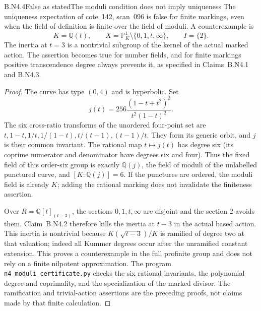 \begin{claim}{B.N4.4}{False as stated}{The moduli condition does not imply uniqueness}
The uniqueness expectation of cote~142, scan~096 is false for finite
markings, even when the field of definition is finite over the field of
moduli.  A counterexample is
\[
 K=\mathbb Q(t),\qquad
 X=\mathbb P^1_K\setminus\{0,1,t,\infty\},\qquad I=\{2\}.
\]
The inertia at $t=3$ is a nontrivial subgroup of the kernel of the actual
marked action.  The assertion becomes true for number fields, and for
finite markings positive transcendence degree always prevents it, as
specified in Claims~B.N4.1 and B.N4.3.
\end{claim}
\begin{proof}
The curve has type $(0,4)$ and is hyperbolic.  Set
\[
 j(t)=256\frac{(1-t+t^2)^3}{t^2(1-t)^2}.
\]
The six cross-ratio transforms of the unordered four-point set are
$t,1-t,1/t,1/(1-t),t/(t-1),(t-1)/t$.  They form its generic orbit,
and $j$ is their common invariant.  The rational map $t\mapsto j(t)$
has degree six (its coprime numerator and denominator have degrees six
and four).  Thus the fixed field of this order-six group is exactly
$\mathbb Q(j)$, the field of moduli of the unlabelled punctured curve,
and $[K:\mathbb Q(j)]=6$.  If the punctures are ordered, the moduli
field is already $K$; adding the rational marking does not invalidate
the finiteness assertion.

Over $R=\mathbb Q[t]_{(t-3)}$, the sections $0,1,t,\infty$ are disjoint
and the section $2$ avoids them.  Claim~B.N4.2 therefore kills the
inertia at $t-3$ in the actual based action.  This inertia is nontrivial
because $K(\sqrt{t-3})/K$ is ramified of degree two at that valuation;
indeed all Kummer degrees occur after the unramified constant extension.
This proves a counterexample in the full profinite group and does not
rely on a finite nilpotent approximation.  The program
\texttt{n4\_moduli\_certificate.py} checks the six rational invariants,
the polynomial degree and coprimality, and the specialization of the
marked divisor.  The ramification and trivial-action assertions are the
preceding proofs, not claims made by that finite calculation.
\end{proof}


